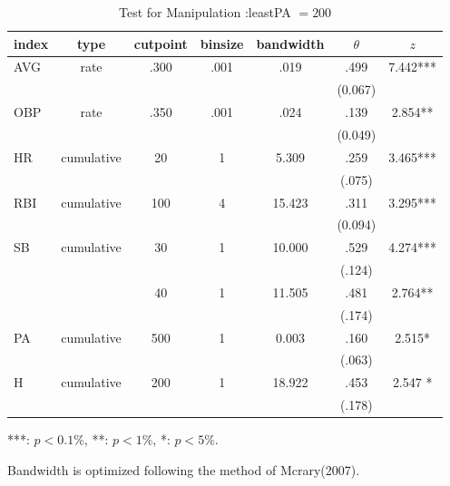 \documentclass[dvipdfmx, 12pt]{article}
\begin{document}
\begin{table}[H]
  \centering
  \begin{tabular}{lcccccc}\hline
    index & type & cutpoint & binsize & bandwidth & $\theta$ & $z$
    \\ \hline \hline
    AVG & rate & .300 & .001 & .019 &  .499 & 7.442*** \\
    & & & & & (0.067) & \\
    OBP & rate & .350 & .001 & .024 &  .139 & 2.854** \\
    & & & & & (0.049) &  \\
    HR & cumulative & 20 & 1 & 5.309 & .259 & 3.465*** \\
    & & & & & (.075)  & \\
    RBI & cumulative & 100 & 4 & 15.423 & .311 & 3.295*** \\
    & & & & & (0.094) & \\
    SB & cumulative & 30 & 1 & 10.000 & .529 & 4.274*** \\
    & & & & & (.124) & \\
    & & 40 & 1 & 11.505 & .481 & 2.764** \\
    & & & & & (.174) & \\
    PA & cumulative & 500 & 1 & 0.003 & .160 & 2.515* \\
    & & & & &(.063) & \\
    H & cumulative & 200 & 1 & 18.922 & .453 & 2.547 * \\
    & & & & & (.178) & \\ \hline \hline
  \end{tabular}
  \footnotesize
  \flushright
      ***: $p<0.1\%$, **: $p<1\%$, *: $p<5\%$.

    Bandwidth is optimized following the method of Mcrary(2007).
  \normalsize
  \caption{Test for Manipulation :leastPA $= 200$}
\end{table}
\end{document}
